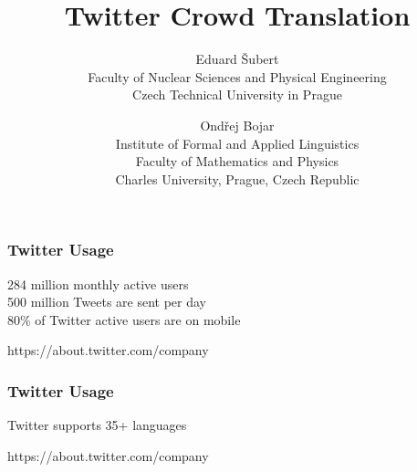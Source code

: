 \documentclass[12pt]{beamer}
\title{\textbf{Twitter Crowd Translation}}
\author{
Eduard \v{S}ubert\\
Faculty of Nuclear Sciences and Physical Engineering\\
Czech Technical University in Prague\\
\and
Ond\v{r}ej Bojar\\
Institute of Formal and Applied Linguistics\\
Faculty of Mathematics and Physics\\
Charles University, Prague, Czech Republic
}
\begin{document}
\frame{\titlepage}


\begin{frame}
	\frametitle{Twitter Usage}
	\vfill
	\begin{center}
	\textcolor{TCTsilver}{\Large 284 million monthly active users}
	\\[0.7cm]
	\textcolor{TCTsilver}{\Large 500 million Tweets are sent per day}
	\\[0.7cm]
	\textcolor{TCTsilver}{\Large 80\% of Twitter active users are on mobile}
	\end{center}
	\vfill
	\hfill\textcolor{TCTsilver}{https://about.twitter.com/company}
\end{frame}

\begin{frame}
	\frametitle{Twitter Usage}
	\vfill
	\begin{center}
	\textcolor{TCTgray}{\Large Twitter supports 35+ languages}
	\end{center}
	\vfill
	\hfill\textcolor{TCTgray}{https://about.twitter.com/company}
\end{frame}

\end{document}
